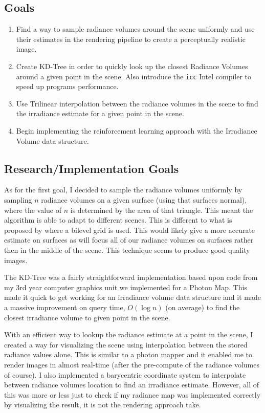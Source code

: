\documentclass[conference]{IEEEtran}
\begin{document}
\subsection{Goals}
\begin{enumerate}
\item Find a way to sample radiance volumes around the scene uniformly and use their estimates in the rendering pipeline to create a perceptually realistic image.
\item Create KD-Tree in order to quickly look up the closest Radiance Volumes around a given point in the scene. Also introduce the \verb|icc| Intel compiler to speed up programs performance.
\item Use Trilinear interpolation between the radiance volumes in the scene to find the irradiance estimate for a given point in the scene.
\item Begin implementing the reinforcement learning approach with the Irradiance Volume data structure.
\end{enumerate}

\subsection{Research/Implementation Goals}
As for the first goal, I decided to sample the radiance volumes uniformly by sampling $n$ radiance volumes on a given surface (using that surfaces normal), where the value of $n$ is determined by the area of that triangle. This meant the algorithm is able to adapt to different scenes. This is different to what is proposed by \cite{greger1998irradiance} where a bilevel grid is used. This would likely give a more accurate estimate on surfaces as will focus all of our radiance volumes on surfaces rather then in the middle of the scene. This technique seems to produce good quality images.

The KD-Tree was a fairly straightforward implementation based upon code from my 3rd year computer graphics unit we implemented for a Photon Map. This made it quick to get working for an irradiance volume data structure and it made a massive improvement on query time, $O(\log{n})$ (on average) to find the closest irradiance volume to given point in the scene.

With an efficient way to lookup the radiance estimate at a point in the scene, I created a way for visualizing the scene using interpolation between the stored radiance values alone. This is similar to a photon mapper and it enabled me to render images in almost real-time (after the pre-compute of the radiance volumes of course). I also implemented a barycentric coordinate system to interpolate between radiance volumes location to find an irradiance estimate. However, all of this was more or less just to check if my radiance map was implemented correctly by visualizing the result, it is not the rendering approach \cite{dahm2017learning} take.
\end{document}
